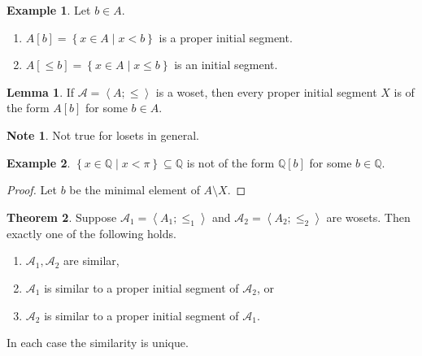 \documentclass{article}
\newcommand{\Q}{\mathbb{Q}}
\newcommand{\A}{\mathcal{A}}
\renewcommand{\sb}[1]{\left[ #1 \right]}
\newcommand{\cb}[1]{\left\{ #1 \right\}}
\newcommand{\ab}[1]{\left\langle #1 \right\rangle}
\theoremstyle{definition}\newtheorem{definition}{Definition}[subsection]
\theoremstyle{definition}\newtheorem{remark}[definition]{Remark}
\theoremstyle{definition}\newtheorem*{example}{Example}
\theoremstyle{definition}\newtheorem*{note}{Note}
\newtheorem{lemma}[definition]{Lemma}
\newtheorem{theorem}[definition]{Theorem}
\begin{document}
\begin{example}
Let $ b \in A $.
\begin{enumerate}
\item $ A\sb{b} = \cb{x \in A \mid x < b} $ is a proper initial segment.
\item $ A\sb{\le b} = \cb{x \in A \mid x \le b} $ is an initial segment.
\end{enumerate}
\end{example}

\begin{lemma}
\label{lem:3.3.6}
If $ \A = \ab{A; \le} $ is a woset, then every proper initial segment $ X $ is of the form $ A\sb{b} $ for some $ b \in A $.
\end{lemma}

\begin{note}
Not true for losets in general.
\end{note}

\begin{example}
$ \cb{x \in \Q \mid x < \pi} \subseteq \Q $ is not of the form $ \Q\sb{b} $ for some $ b \in \Q $.
\end{example}

\begin{proof}
Let $ b $ be the minimal element of $ A \setminus X $.
\end{proof}

\begin{theorem}
\label{thm:3.3.7}
Suppose $ \A_1 = \ab{A_1; \le_1} $ and $ \A_2 = \ab{A_2; \le_2} $ are wosets. Then exactly one of the following holds.
\begin{enumerate}
\item $ \A_1, \A_2 $ are similar,
\item $ \A_1 $ is similar to a proper initial segment of $ \A_2 $, or
\item $ \A_2 $ is similar to a proper initial segment of $ \A_1 $.
\end{enumerate}
In each case the similarity is unique.
\end{theorem}
\end{document}
